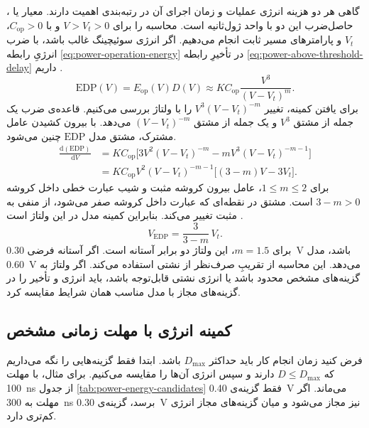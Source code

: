 گاهی هر دو هزینه انرژی عملیات و زمان اجرای آن در رتبه‌بندی اهمیت
دارند. معیار  یا ، حاصل‌ضرب
این دو با واحد ژول‌ثانیه است. محاسبه را برای \(V>V_t>0\) و با
\(C_{\mathrm{op}}>0\)، \(V_t\) و پارامترهای مسیر ثابت انجام می‌دهیم.
اگر انرژی سوئیچینگ غالب باشد، با ضرب انرژیِ رابطه
\eqref{eq:power-operation-energy} در تأخیرِ رابطه
\eqref{eq:power-above-threshold-delay} داریم
\cite[رابطه ، صفحه ۲۰۳]{weste}.
\begin{equation}
  \mathrm{EDP}(V)=E_{\mathrm{op}}(V)D(V)
       \approx K C_{\mathrm{op}}\frac{V^3}{(V-V_t)^m}.
  \label{eq:power-edp}
\end{equation}
برای یافتن کمینه، تغییر \(V^3(V-V_t)^{-m}\) را با ولتاژ بررسی
می‌کنیم. قاعده‌ی ضرب یک جمله از مشتق \(V^3\) و یک جمله از
مشتق \((V-V_t)^{-m}\) می‌دهد. با بیرون کشیدن عامل مشترک، مشتق
مدل \(\mathrm{EDP}\) چنین می‌شود.
\[
  \begin{aligned}
    \frac{\mathrm{d}(\mathrm{EDP})}{\mathrm{d}V}
       &=K C_{\mathrm{op}}\bigl[3V^2(V-V_t)^{-m}
                         -mV^3(V-V_t)^{-m-1}\bigr]\\
       &=K C_{\mathrm{op}} V^2 (V-V_t)^{-m-1}
           \bigl[(3-m)V-3V_t\bigr].
  \end{aligned}
\]
برای \(1\leq m\leq 2\)، عامل بیرون کروشه مثبت و شیب عبارت
خطی داخل کروشه \(3-m>0\) است. مشتق در نقطه‌ای که عبارت داخل
کروشه صفر می‌شود، از منفی به مثبت تغییر می‌کند. بنابراین کمینه
مدل در این ولتاژ است \cite[رابطه ، صفحه ۲۰۳]{weste}.
\begin{equation}
  V_{\mathrm{EDP}}=\frac{3}{3-m}\,V_t.
  \label{eq:power-edp-voltage}
\end{equation}
برای \(m=1.5\)، این ولتاژ دو برابر آستانه‌ است. اگر آستانه
فرضی \qty{0.30}{\volt} باشد، مدل \qty{0.60}{\volt} می‌دهد.
این محاسبه از تقریبِ صرف‌نظر از نشتی استفاده می‌کند. اگر ولتاژ
به گزینه‌های مشخص محدود باشد یا انرژی نشتی قابل‌توجه باشد، باید
انرژی و تأخیر را در گزینه‌های مجاز با مدل مناسب همان شرایط مقایسه کرد.

\subsection{کمینه انرژی با مهلت زمانی مشخص}
\label{sec:power-delay-constraint}

فرض کنید زمان انجام کار باید حداکثر \(D_{\max}\) باشد. ابتدا فقط
گزینه‌هایی را نگه می‌داریم که \(D\leq D_{\max}\) دارند و سپس انرژی
آن‌ها را مقایسه می‌کنیم. برای مثال، با مهلت \qty{100}{\nano\second}
از جدول \ref{tab:power-energy-candidates} فقط گزینه‌ی
\qty{0.40}{\volt} می‌ماند. اگر مهلت به \qty{300}{\nano\second}
برسد، گزینه‌ی \qty{0.30}{\volt} نیز مجاز می‌شود و میان گزینه‌های
مجاز انرژی کم‌تری دارد.

